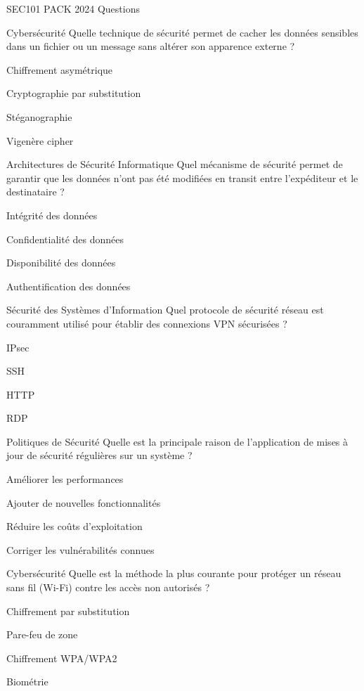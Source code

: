 \documentclass[12pt]{article}
\begin{document}
\begin{quiz}{SEC101 PACK 2024 Questions}
  \begin{multi}[points=1]{Cybersécurité}
    Quelle technique de sécurité permet de cacher les données sensibles dans un fichier ou un message sans altérer son apparence externe ?
    \item Chiffrement asymétrique
    \item Cryptographie par substitution
    \item* Stéganographie
    \item Vigenère cipher
  \end{multi}

  \begin{multi}[points=1]{Architectures de Sécurité Informatique}
    Quel mécanisme de sécurité permet de garantir que les données n'ont pas été modifiées en transit entre l'expéditeur et le destinataire ?
    \item* Intégrité des données
    \item Confidentialité des données
    \item Disponibilité des données
    \item Authentification des données
  \end{multi}

  \begin{multi}[points=1]{Sécurité des Systèmes d'Information}
    Quel protocole de sécurité réseau est couramment utilisé pour établir des connexions VPN sécurisées ?
    \item* IPsec
    \item SSH
    \item HTTP
    \item RDP
  \end{multi}

  \begin{multi}[points=1]{Politiques de Sécurité}
    Quelle est la principale raison de l'application de mises à jour de sécurité régulières sur un système ?
    \item Améliorer les performances
    \item Ajouter de nouvelles fonctionnalités
    \item Réduire les coûts d'exploitation
    \item* Corriger les vulnérabilités connues
  \end{multi}

  \begin{multi}[points=1]{Cybersécurité}
    Quelle est la méthode la plus courante pour protéger un réseau sans fil (Wi-Fi) contre les accès non autorisés ?
    \item Chiffrement par substitution
    \item Pare-feu de zone
    \item* Chiffrement WPA/WPA2
    \item Biométrie
  \end{multi}


\end{quiz}
\end{document}
